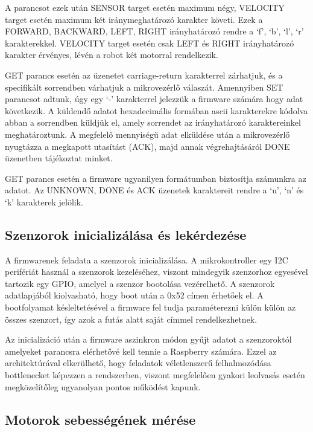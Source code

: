 A parancsot ezek után SENSOR target esetén maximum négy, VELOCITY target esetén
maximum két iránymeghatározó karakter követi. Ezek a FORWARD, BACKWARD, LEFT,
RIGHT irányhatározó rendre a `f', `b', `l', `r' karakterekkel. VELOCITY target
esetén csak LEFT és RIGHT irányhatározó karakter érvényes, lévén a robot két
motorral rendelkezik. 

GET parancs esetén az üzenetet carriage-return karakterrel zárhatjuk, és a
specifikált sorrendben várhatjuk a mikrovezérlő válaszát. Amennyiben SET
parancsot adtunk, úgy egy `-' karakterrel jelezzük a firmware számára hogy adat
következik. A küldendő adatot hexadecimális formában ascii karakterekre kódolva
abban a sorrendben küldjük el, amely sorrendet az irányhatározó karaktereinkel
meghatároztunk. A megfelelő mennyiségű adat elküldése után a mikrovezérlő
nyugtázza a megkapott utasítást (ACK), majd annak végrehajtásáról DONE üzenetben
tájékoztat minket.

GET parancs esetén a firmware ugyanilyen formátumban biztosítja számunkra az
adatot. Az UNKNOWN, DONE és ACK üzenetek karaktereit rendre a `u', `n' és `k'
karakterek jelölik.

\medskip

\subsection{Szenzorok inicializálása és lekérdezése}

A firmwarenek feladata a szenzorok inicializálása. A mikrokontroller egy I2C
perifériát használ a szenzorok kezeléséhez, viszont mindegyik szenzorhoz
egyesével tartozik egy GPIO, amelyel a szenzor bootolása vezérelhető. A szenzorok
adatlapjából kiolvasható, hogy boot után a 0x52 címen érhetőek el. A bootfolyamat
késleltetésével a firmware fel tudja paraméterezni külön külön az összes
szenzort, így azok a futás alatt saját címmel rendelkezhetnek.

Az inicializáció után a firmware aszinkron módon gyűjt adatot a szenzoroktól
amelyeket parancsra elérhetővé kell tennie a Raspberry számára. Ezzel az
architektúrával elkerülhető, hogy feladatok véletlenszerű felhalmozódása
bottlenecket képezzen a rendszerben, viszont megfelelően gyakori leolvasás esetén
megközelítőleg ugyanolyan pontos működést kapunk.

\subsection{Motorok sebességének mérése}

